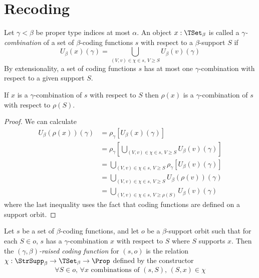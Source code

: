 \section{Recoding}
\begin{definition}
  \label{def:Combination}
  Let \( \gamma < \beta \) be proper type indices at most \( \alpha \).
  An object \( x : \TSet_\beta \) is called a \emph{\( \gamma \)-combination} of a set of \( \beta \)-coding functions \( s \) with respect to a \( \beta \)-support \( S \) if
  \[ U_\beta(x)(\gamma) = \bigcup_{(V, v) \in \chi \in s,\, V \geq S} U_\beta(v)(\gamma) \]
  By extensionality, a set of coding functions \( s \) has at most one \( \gamma \)-combination with respect to a given support \( S \).
\end{definition}
\begin{proposition}
  \label{prop:Combination.smul}
  If \( x \) is a \( \gamma \)-combination of \( s \) with respect to \( S \) then \( \rho(x) \) is a \( \gamma \)-combination of \( s \) with respect to \( \rho(S) \).
\end{proposition}
\begin{proof}
  We can calculate
  \begin{align*}
    U_\beta(\rho(x))(\gamma)
    &= \rho_\gamma[U_\beta(x)(\gamma)] \\
    &= \rho_\gamma\left[ \bigcup_{(V, v) \in \chi \in s,\, V \geq S} U_\beta(v)(\gamma) \right] \\
    &= \bigcup_{(V, v) \in \chi \in s,\, V \geq S} \rho_\gamma\left[ U_\beta(v)(\gamma) \right] \\
    &= \bigcup_{(V, v) \in \chi \in s,\, V \geq S} U_\beta(\rho(v))(\gamma) \\
    &= \bigcup_{(V, v) \in \chi \in s,\, V \geq \rho(S)} U_\beta(v)(\gamma)
  \end{align*}
  where the last inequality uses the fact that coding functions are defined on a support orbit.
\end{proof}
\begin{definition}
  \label{def:raisedCodingFunction}
  Let \( s \) be a set of \( \beta \)-coding functions, and let \( o \) be a \( \beta \)-support orbit such that for each \( S \in o \), \( s \) has a \( \gamma \)-combination \( x \) with respect to \( S \) where \( S \) supports \( x \).
  Then the \emph{\( (\gamma,\beta) \)-raised coding function} for \( (s, o) \) is the relation \( \chi : \StrSupp_\beta \to \TSet_\beta \to \Prop \) defined by the constructor
  \[ \forall S \in o,\, \forall x \text{ combinations of } (s, S),\, (S, x) \in \chi \]
\end{definition}

